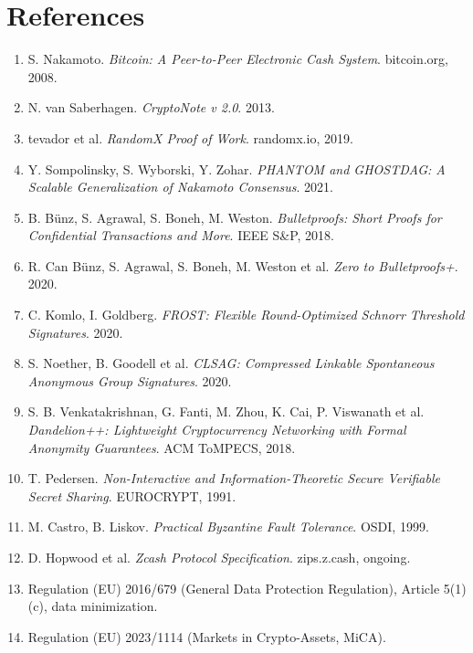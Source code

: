\section*{References}
\begin{enumerate}[leftmargin=1.6em, itemsep=1.5pt, topsep=4pt]
\item S. Nakamoto. \emph{Bitcoin: A Peer-to-Peer Electronic Cash System}. bitcoin.org, 2008.
\item N. van Saberhagen. \emph{CryptoNote v 2.0}. 2013.
\item tevador et al. \emph{RandomX Proof of Work}. randomx.io, 2019.
\item Y. Sompolinsky, S. Wyborski, Y. Zohar. \emph{PHANTOM and GHOSTDAG: A Scalable Generalization of Nakamoto Consensus}. 2021.
\item B. B\"unz, S. Agrawal, S. Boneh, M. Weston. \emph{Bulletproofs: Short Proofs for Confidential Transactions and More}. IEEE S\&P, 2018.
\item R. Can B\"unz, S. Agrawal, S. Boneh, M. Weston et al. \emph{Zero to Bulletproofs+}. 2020.
\item C. Komlo, I. Goldberg. \emph{FROST: Flexible Round-Optimized Schnorr Threshold Signatures}. 2020.
\item S. Noether, B. Goodell et al. \emph{CLSAG: Compressed Linkable Spontaneous Anonymous Group Signatures}. 2020.
\item S. B. Venkatakrishnan, G. Fanti, M. Zhou, K. Cai, P. Viswanath et al. \emph{Dandelion++: Lightweight Cryptocurrency Networking with Formal Anonymity Guarantees}. ACM ToMPECS, 2018.
\item T. Pedersen. \emph{Non-Interactive and Information-Theoretic Secure Verifiable Secret Sharing}. EUROCRYPT, 1991.
\item M. Castro, B. Liskov. \emph{Practical Byzantine Fault Tolerance}. OSDI, 1999.
\item D. Hopwood et al. \emph{Zcash Protocol Specification}. zips.z.cash, ongoing.
\item Regulation (EU) 2016/679 (General Data Protection Regulation), Article 5(1)(c), data minimization.
\item Regulation (EU) 2023/1114 (Markets in Crypto-Assets, MiCA).
\end{enumerate}
